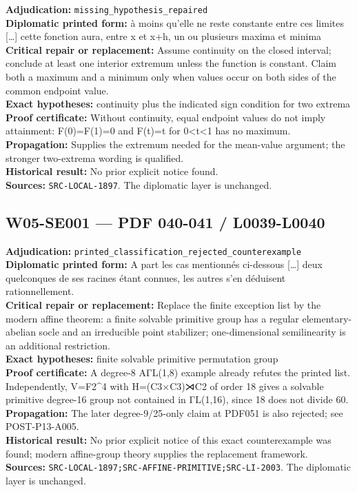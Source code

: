 \documentclass[
  10pt,
  a4paper,
]{scrreprt}
\begin{document}
\textbf{Adjudication:} \texttt{missing\_hypothesis\_repaired}\\
\textbf{Diplomatic printed form:} à moins qu'elle ne reste constante
entre ces limites {[}\ldots{]} cette fonction aura, entre x et x+h, un
ou plusieurs maxima et minima\\
\textbf{Critical repair or replacement:} Assume continuity on the closed
interval; conclude at least one interior extremum unless the function is
constant. Claim both a maximum and a minimum only when values occur on
both sides of the common endpoint value.\\
\textbf{Exact hypotheses:} continuity plus the indicated sign condition
for two extrema\\
\textbf{Proof certificate:} Without continuity, equal endpoint values do
not imply attainment: F(0)=F(1)=0 and F(t)=t for 0\textless t\textless1
has no maximum.\\
\textbf{Propagation:} Supplies the extremum needed for the mean-value
argument; the stronger two-extrema wording is qualified.\\
\textbf{Historical result:} No prior explicit notice found.\\
\textbf{Sources:} \texttt{SRC-LOCAL-1897}. The diplomatic layer is
unchanged.

\subsection{W05-SE001 --- PDF 040-041 /
L0039-L0040}\label{w05-se001-pdf-040-041-l0039-l0040}

\textbf{Adjudication:}
\texttt{printed\_classification\_rejected\_counterexample}\\
\textbf{Diplomatic printed form:} A part les cas mentionnés ci-dessous
{[}\ldots{]} deux quelconques de ses racines étant connues, les autres
s'en déduisent rationnellement.\\
\textbf{Critical repair or replacement:} Replace the finite exception
list by the modern affine theorem: a finite solvable primitive group has
a regular elementary-abelian socle and an irreducible point stabilizer;
one-dimensional semilinearity is an additional restriction.\\
\textbf{Exact hypotheses:} finite solvable primitive permutation group\\
\textbf{Proof certificate:} A degree-8 AΓL(1,8) example already refutes
the printed list. Independently, V=F2\^{}4 with H=(C3×C3)⋊C2 of order 18
gives a solvable primitive degree-16 group not contained in ΓL(1,16),
since 18 does not divide 60.\\
\textbf{Propagation:} The later degree-9/25-only claim at PDF051 is also
rejected; see POST-P13-A005.\\
\textbf{Historical result:} No prior explicit notice of this exact
counterexample was found; modern affine-group theory supplies the
replacement framework.\\
\textbf{Sources:}
\texttt{SRC-LOCAL-1897;SRC-AFFINE-PRIMITIVE;SRC-LI-2003}. The diplomatic
layer is unchanged.
\end{document}
